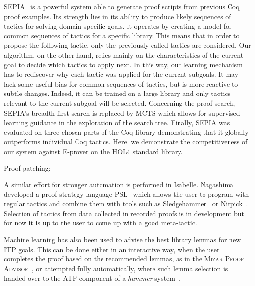 \documentclass[runningheads,a4paper,draft]{svjour3}
\def\holfour{\textsf{HOL4}\xspace}
\def\isabelle{\textsf{Isabelle}\xspace}
\def\coq{\textsf{Coq}\xspace}
\def\eprover{\textsf{E-prover}\xspace}
\def\sledgehammer{\textsf{Sledgehammer}\xspace}
\begin{document}
\textsf{SEPIA}~\cite{DBLP:conf/cade/GransdenWR15} is a powerful system able to 
generate
proof scripts from previous \coq proof examples.
Its strength lies in its ability to produce likely sequences 
of tactics for solving domain specific goals. It operates by creating a model 
for common sequences of tactics for a specific library.
This means that in order to propose the following tactic, only the previously 
called tactics
are considered.
Our algorithm, on the other hand, relies mainly on the characteristics of the 
current goal 
to decide
which tactics to apply next. In this way, our learning mechanism has to 
rediscover why each 
tactic was applied for the current subgoals. It may lack some useful bias for 
common sequences 
of tactics, but is more reactive to subtle changes. Indeed, it can be trained 
on a large library and only tactics relevant to the current subgoal will be 
selected. 
Concerning the proof search, \textsf{SEPIA}'s %
breadth-first search is replaced by MCTS which allows for supervised learning
guidance in the exploration of the search tree.
Finally, \textsf{SEPIA} was evaluated on three chosen parts of the 
\coq library demonstrating that it globally outperforms individual \coq 
tactics. Here, we demonstrate the competitiveness of our system against 
\eprover on the \holfour standard library.

Proof patching: \cite{RingerYLG18}

A similar effort for stronger automation is performed in \isabelle. Nagashima 
developed a proof strategy language PSL~\cite{NagashimaK17psl} which allows the 
user to 
program with regular tactics and combine them with tools such as 
\sledgehammer~\cite{sledgehammer10} or Nitpick~\cite{Nitpick10}. 
Selection of tactics from data collected in recorded proofs is in development 
but for now it is up to the user to come up with a good meta-tactic.


Machine learning has also been used to advise the best library lemmas for new 
ITP goals.
This can be done either in an interactive way, when the user completes the 
proof based on the recommended lemmas, as in the \textsc{Mizar Proof 
Advisor}~\cite{Urb04-MPTP0}, or attempted fully automatically, where such lemma 
selection is handed over to the ATP component of a \emph{hammer} 
system~\cite{hammers4qed,tgck-cpp15,holyhammer,BlanchetteGKKU16,mizAR40}.
\end{document}
